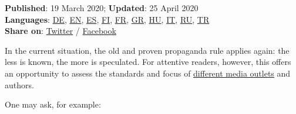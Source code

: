 \textbf{Published}: 19 March 2020; \textbf{Updated}: 25 April 2020\\
\textbf{Languages}:
\href{https://swprs.org/corona-medien-propaganda/}{DE},
\href{https://swprs.org/corona-media-propaganda/}{EN},
\href{http://piensachile.com/2020/03/corona-medios-de-comunicacion-propaganda/}{ES},
\href{https://swprs.org/koronasta-mediasta-ja-propagandasta/}{FI},
\href{https://swprs.org/sur-le-coronavirus-les-medias-et-la-propagande/}{FR},
\href{https://swprs.org/corona-media-propaganda-greek/}{GR},
\href{https://swprs.org/korona-media-propaganda/}{HU},
\href{https://swprs.org/corona-media-propaganda-it/}{IT},
\href{https://swprs.org/\%d0\%be-\%d0\%ba\%d0\%be\%d1\%80\%d0\%be\%d0\%bd\%d0\%b0\%d0\%b2\%d0\%b8\%d1\%80\%d1\%83\%d1\%81\%d0\%b5-\%d1\%81\%d0\%bc\%d0\%b8-\%d0\%b8-\%d0\%bf\%d1\%80\%d0\%be\%d0\%bf\%d0\%b0\%d0\%b3\%d0\%b0\%d0\%bd\%d0\%b4\%d0\%b5/}{RU},
\href{https://swprs.org/korona-medya-ve-propaganda-uezerine/}{TR}\\
\textbf{Share on}:
\href{https://twitter.com/intent/tweet?url=https://swprs.org/corona-media-propaganda/}{Twitter}
/
\href{https://www.facebook.com/share.php?u=https://swprs.org/corona-media-propaganda/}{Facebook}

In the current situation, the old and proven propaganda rule applies
again: the less is known, the more is speculated. For attentive readers,
however, this offers an opportunity to assess the standards and focus of
\href{https://swprs.org/media-navigator/}{different media outlets} and
authors.

One may ask, for example:

